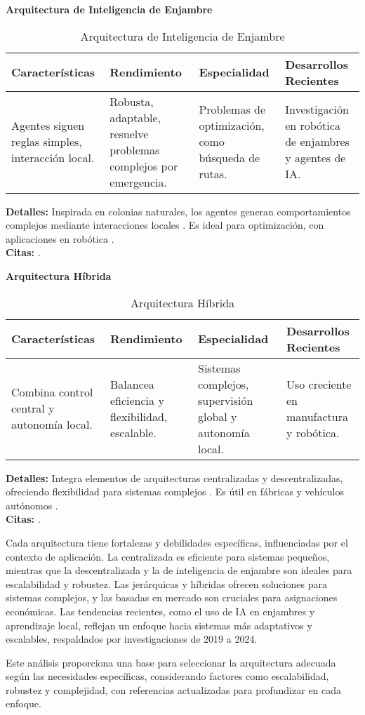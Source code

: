 	\textbf{Arquitectura de Inteligencia de Enjambre}
	\begin{table}[h!]
		\centering
		\begin{tabular}{|p{4cm}|p{4cm}|p{4cm}|p{4cm}|}
			\hline
			\textbf{Características} & \textbf{Rendimiento} & \textbf{Especialidad} & \textbf{Desarrollos Recientes} \\
			\hline
			Agentes siguen reglas simples, interacción local. & Robusta, adaptable, resuelve problemas complejos por emergencia. & Problemas de optimización, como búsqueda de rutas. & Investigación en robótica de enjambres y agentes de IA. \\
			\hline
		\end{tabular}
		\caption{Arquitectura de Inteligencia de Enjambre}
	\end{table}
	\textbf{Detalles:} Inspirada en colonias naturales, los agentes generan comportamientos complejos mediante interacciones locales \citep{riegler2024exploring}. Es ideal para optimización, con aplicaciones en robótica \citep{luo2021hybrid}.\\
	\textbf{Citas:} \citep{riegler2024exploring, quora_swarm, luo2021hybrid}.
	
	\textbf{Arquitectura Híbrida}
	\begin{table}[h!]
		\centering
		\begin{tabular}{|p{4cm}|p{4cm}|p{4cm}|p{4cm}|}
			\hline
			\textbf{Características} & \textbf{Rendimiento} & \textbf{Especialidad} & \textbf{Desarrollos Recientes} \\
			\hline
			Combina control central y autonomía local. & Balancea eficiencia y flexibilidad, escalable. & Sistemas complejos, supervisión global y autonomía local. & Uso creciente en manufactura y robótica. \\
			\hline
		\end{tabular}
		\caption{Arquitectura Híbrida}
	\end{table}
	\textbf{Detalles:} Integra elementos de arquitecturas centralizadas y descentralizadas, ofreciendo flexibilidad para sistemas complejos \citep{smythos2024understanding}. Es útil en fábricas y vehículos autónomos \citep{palau2019multi}.\\
	\textbf{Citas:} \citep{ibm_multiagent, smythos2024understanding, palau2019multi}.
	

	Cada arquitectura tiene fortalezas y debilidades específicas, influenciadas por el contexto de aplicación. La centralizada es eficiente para sistemas pequeños, mientras que la descentralizada y la de inteligencia de enjambre son ideales para escalabilidad y robustez. Las jerárquicas y híbridas ofrecen soluciones para sistemas complejos, y las basadas en mercado son cruciales para asignaciones económicas. Las tendencias recientes, como el uso de IA en enjambres y aprendizaje local, reflejan un enfoque hacia sistemas más adaptativos y escalables, respaldados por investigaciones de 2019 a 2024.
	
	Este análisis proporciona una base para seleccionar la arquitectura adecuada según las necesidades específicas, considerando factores como escalabilidad, robustez y complejidad, con referencias actualizadas para profundizar en cada enfoque.
	





